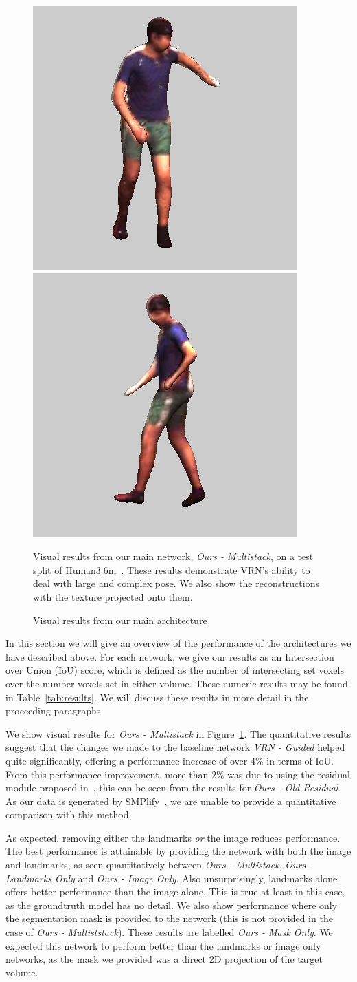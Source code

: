 \begin{figure}
\includegraphics[width=0.2\linewidth]{img/results/multistack-textured/S11WalkTogether_1_60457274_mp4_frame00026__max200_pad25_jpg.png}
\includegraphics[width=0.2\linewidth]{img/results/multistack-textured/S11WalkTogether_1_60457274_mp4_frame00031__max200_pad25_jpg.png}
\caption{Visual results from our main architecture}{Visual results
  from our main network, \textit{Ours - Multistack}, on a test split
  of Human3.6m~\cite{h36m_pami}. These results demonstrate VRN's
  ability to deal with large and complex pose. We also show the
  reconstructions with the texture projected onto them.}
\label{fig:visres_ours}
\end{figure}


In this section we will give an overview of the performance of the
architectures we have described above. For each network, we give our
results as an Intersection over Union (IoU) score, which is defined as
the number of intersecting set voxels over the number voxels set in
either volume. These numeric results may be found in
Table~\ref{tab:results}. We will discuss these results in more detail
in the proceeding paragraphs.

We show visual results for \textit{Ours - Multistack} in
Figure~\ref{fig:visres_ours}. The quantitative results suggest that
the changes we made to the baseline network \textit{VRN - Guided}
helped quite significantly, offering a performance increase of over
4\% in terms of IoU. From this performance improvement, more than 2\%
was due to using the residual module proposed
in~\cite{bulat2017binarized}, this can be seen from the results for
\textit{Ours - Old Residual}. As our data is generated by
SMPlify~\cite{bogo2016smplify}, we are unable to provide a
quantitative comparison with this method.

As expected, removing either the landmarks \textit{or} the image
reduces performance. The best performance is attainable by providing
the network with both the image and landmarks, as seen quantitatively
between \textit{Ours - Multistack}, \textit{Ours - Landmarks Only} and
\textit{Ours - Image Only}. Also unsurprisingly, landmarks alone
offers better performance than the image alone. This is true at least
in this case, as the groundtruth model has no detail. We also show
performance where only the segmentation mask is provided to the
network (this is not provided in the case of \textit{Ours -
  Multiststack}). These results are labelled \textit{Ours - Mask
  Only}. We expected this network to perform better than the landmarks
or image only networks, as the mask we provided was a direct 2D
projection of the target volume.


